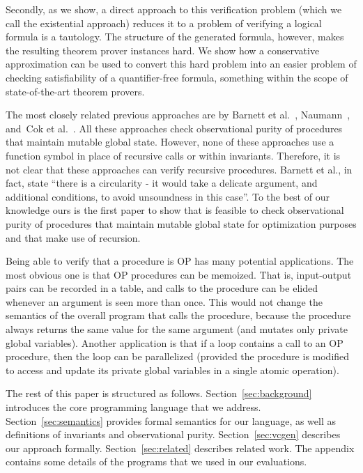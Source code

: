 Secondly, as we show, a direct approach to this verification problem (which we
call the existential approach) reduces it to a problem of verifying a logical formula
is a tautology. The structure of the generated formula, however, makes the resulting
theorem prover instances hard. We show how a conservative approximation can be
used to convert this hard problem into an easier problem of checking satisfiability
of a quantifier-free formula, something within the scope of state-of-the-art theorem
provers.


The most closely related previous approaches are by Barnett et
al.~\cite{barnett200499,barnett2006allowing},
Naumann~\cite{naumann2007observational}, and~Cok et
al.~\cite{cok2008extensions}.  All these approaches check observational
purity of procedures that maintain mutable global state. However, none of
these approaches use a function symbol in place of recursive calls or
within invariants. Therefore, it is not clear that these approaches can
verify recursive procedures. 
Barnett et al., in fact, state ``there is a circularity - it would take a delicate argument, and additional conditions,
to avoid unsoundness in this case''.
To the best of our knowledge ours is the first paper to show that is
feasible to check observational purity of procedures that maintain mutable
global state for optimization purposes and that make use of recursion.

Being able to verify that a procedure is OP has many potential
applications. The most obvious one is that OP procedures can be
memoized. That is, input-output pairs can be recorded in a table, and calls
to the procedure can be elided whenever an argument is seen more than
once. This would not change the semantics of the overall program that calls
the procedure, because the procedure always returns the same value for the
same argument (and mutates only private global variables). Another
application is that if a loop contains a call to an OP procedure, then the
loop can be parallelized (provided the procedure is modified to access and
update its private global variables in a single atomic operation).


The rest of this paper is structured as
follows. Section~\ref{sec:background} introduces the core programming
language that we address. Section~\ref{sec:semantics} provides formal
semantics for our language, as well as definitions of invariants and
observational purity. Section~\ref{sec:vcgen} describes our approach
formally.
Section~\ref{sec:related} describes related work. The appendix contains some details of the programs
that we used in our evaluations. 

